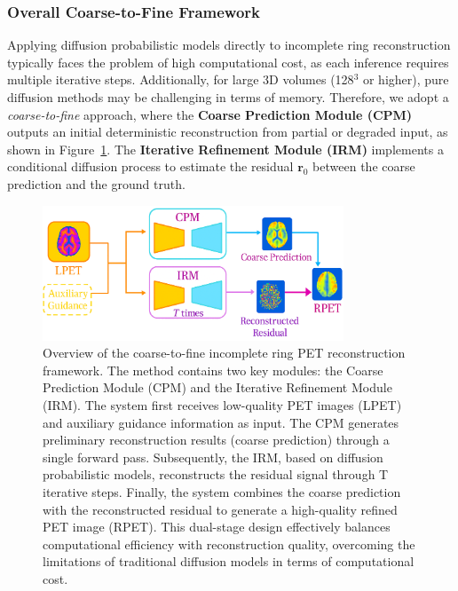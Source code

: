 \documentclass[
reprint,
superscriptaddress,
nofootinbib,
amsmath,amssymb,
aps,
prd,
]{revtex4-2}
\begin{document}
\subsubsection{Overall Coarse-to-Fine Framework}
\label{sec:overall_coarse_fine}
Applying diffusion probabilistic models directly to incomplete ring reconstruction typically faces the problem of high computational cost, as each inference requires multiple iterative steps. Additionally, for large 3D volumes (128\(^3\) or higher), pure diffusion methods may be challenging in terms of memory. Therefore, we adopt a \emph{coarse-to-fine} approach, where the \textbf{Coarse Prediction Module (CPM)} outputs an initial deterministic reconstruction from partial or degraded input, as shown in Figure~\ref{fig:coarse_to_fine_framework}. The
\textbf{Iterative Refinement Module (IRM)} implements a conditional diffusion process to estimate the residual \(\mathbf{r}_0\) between the coarse prediction and the ground truth.

\begin{figure}[ht]
    \centering
    \includegraphics[width=0.8\textwidth]{Images/C2F.png}
    \caption{Overview of the coarse-to-fine incomplete ring PET reconstruction framework. The method contains two key modules: the Coarse Prediction Module (CPM) and the Iterative Refinement Module (IRM). The system first receives low-quality PET images (LPET) and auxiliary guidance information as input. The CPM generates preliminary reconstruction results (coarse prediction) through a single forward pass. Subsequently, the IRM, based on diffusion probabilistic models, reconstructs the residual signal through T iterative steps. Finally, the system combines the coarse prediction with the reconstructed residual to generate a high-quality refined PET image (RPET). This dual-stage design effectively balances computational efficiency with reconstruction quality, overcoming the limitations of traditional diffusion models in terms of computational cost.}
    \label{fig:coarse_to_fine_framework}
\end{figure}
\end{document}

